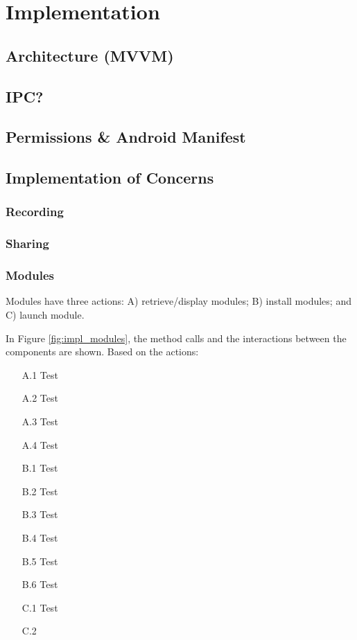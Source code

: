 \chapter{Implementation}

\section{Architecture (MVVM)}
\section{IPC?}
\section{Permissions \& Android Manifest}

\section{Implementation of Concerns}

\subsection{Recording}
\subsection{Sharing}

\subsection{Modules}
Modules have three actions: A) retrieve/display modules; B) install modules; and C) launch module. 

In Figure \ref{fig:impl_modules}, the method calls and the interactions between the components are shown.  Based on the actions: 

\begin{itemize}
    \item[A.1] Test
    \item[A.2] Test
    \item[A.3] Test
    \item[A.4] Test
    \item[B.1] Test
    \item[B.2] Test
    \item[B.3] Test
    \item[B.4] Test
    \item[B.5] Test
    \item[B.6] Test
    \item[C.1] Test 
    \item[C.2]     
\end{itemize}


